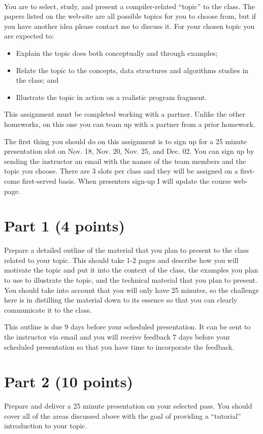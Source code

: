 \documentclass[12pt,letterpaper]{article}
\begin{document}
~

You are to select, study, and present a compiler-related ``topic'' to the class.
The papers listed on the web-site are all possible topics for you to
choose from, but if you have another idea please contact me to discuss it.
For your chosen topic you are expected to:
\begin{itemize}
\item Explain the topic does both conceptually and through examples;
\item Relate the topic to the concepts, data structures and algorithms studies in the class; and
\item Illustrate the topic in action on a realistic program fragment.
\end{itemize}
This assignment must be completed working with a partner.  Unlike the
other homeworks, on this one you can team up with a partner from a 
prior homework. 

The first thing you should do on this assignment is to sign up for
a 25 minute presentation slot on Nov. 18, Nov. 20, Nov. 25, and Dec. 02.  
You can sign up by sending the instructor an email with the names
of the team members and the topic you choose.
There are 3 slots per class and they will be assigned on a first-come 
first-served basis.  When presenters sign-up I will update the 
course web-page.

\section*{Part 1 (4 points)}
Prepare a detailed outline of the material that you plan to present
to the class related to your topic.  This should take 1-2 pages and
describe how you will motivate the topic and put it into the context
of the class, the examples you plan to use to illustrate the topic,
and the technical material that you plan to present.
You should take into account that you will only have 25 minutes, so
the challenge here is in distilling the material down to its essence
so that you can clearly communicate it to the class.

This outline is due 9 days before your scheduled presentation.
It can be sent to the instructor via email and you will receive
feedback 7 days before your scheduled presentation so that you
have time to incorporate the feedback.

\section*{Part 2 (10 points)}
Prepare and deliver a 25 minute presentation on your
selected pass.  You should cover all of the areas discussed above with
the goal of providing a ``tutorial'' introduction to your topic.
\end{document}
